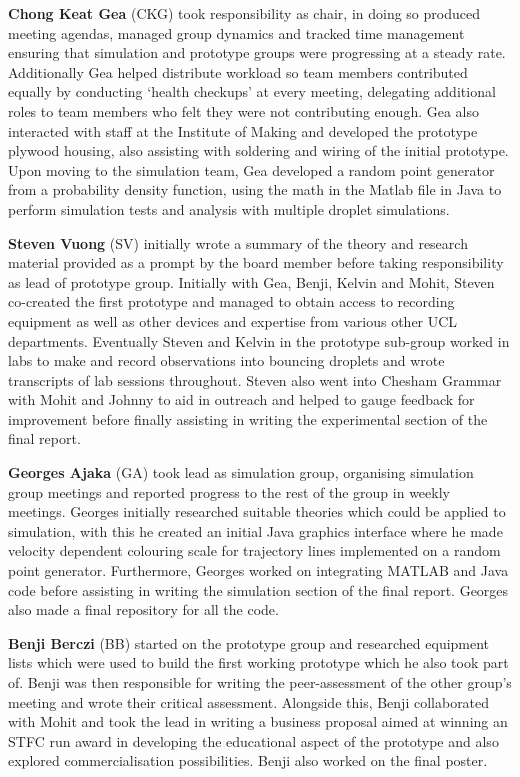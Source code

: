\textbf{Chong Keat Gea} (CKG) took responsibility as chair, in doing so produced meeting agendas, managed group dynamics and tracked time management ensuring that simulation and prototype groups were progressing at a steady rate. Additionally Gea helped distribute workload so team members contributed equally by conducting `health checkups' at every meeting, delegating additional roles to team members who felt they were not contributing enough. Gea also interacted with staff at the Institute of Making and developed the prototype plywood housing, also assisting with soldering and wiring of the initial prototype. Upon moving to the simulation team, Gea developed a random point generator from a probability density function, using the math in the Matlab file in Java to perform simulation tests and analysis with multiple droplet simulations.

\textbf{Steven Vuong} (SV) initially wrote a summary of the theory and research material provided as a prompt by the board member before taking responsibility as lead of prototype group. Initially with Gea, Benji, Kelvin and Mohit, Steven co-created the first prototype and managed to obtain access to recording equipment as well as other devices and expertise from various other UCL departments. Eventually Steven and Kelvin in the prototype sub-group worked in labs to make and record observations into bouncing droplets and wrote transcripts of lab sessions throughout. Steven also went into Chesham Grammar with Mohit and Johnny to aid in outreach and helped to gauge feedback for improvement before finally assisting in writing the experimental section of the final report.

\textbf{Georges Ajaka} (GA) took lead as simulation group, organising simulation group meetings and reported progress to the rest of the group in weekly meetings. Georges initially researched suitable theories which could be applied to simulation, with this he created an initial Java graphics interface where he made velocity dependent colouring scale for trajectory lines implemented on a random point generator. Furthermore, Georges worked on integrating MATLAB and Java code before assisting in writing the simulation section of the final report. Georges also made a final repository for all the code.

\textbf{Benji Berczi} (BB) started on the prototype group and researched equipment lists which were used to build the first working prototype which he also took part of. Benji was then responsible for writing the peer-assessment of the other group's meeting and wrote their critical assessment. Alongside this, Benji collaborated with Mohit and took the lead in writing a business proposal aimed at winning an STFC run award in developing the educational aspect of the prototype and also explored commercialisation possibilities. Benji also worked on the final poster.

